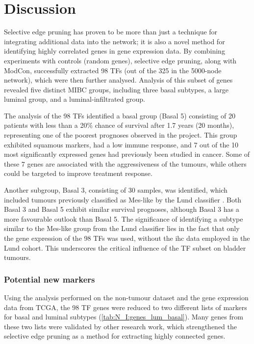 \section{Discussion}

Selective edge pruning has proven to be more than just a technique for integrating additional data into the network; it is also a novel method for identifying highly correlated genes in gene expression data. By combining experiments with controls (random genes), selective edge pruning, along with ModCon, successfully extracted 98 TFs (out of the 325 in the 5000-node network), which were then further analysed. Analysis of this subset of genes revealed five distinct MIBC groups, including three basal subtypes, a large luminal group, and a luminal-infiltrated group.

The analysis of the 98 TFs identified a basal group (Basal 5) consisting of 20 patients with less than a 20\% chance of survival after 1.7 years (20 months), representing one of the poorest prognoses observed in the project. This group exhibited squamous markers, had a low immune response, and 7 out of the 10 most significantly expressed genes had previously been studied in cancer. Some of these 7 genes are associated with the aggressiveness of the tumours, while others could be targeted to improve treatment response.

Another subgroup, Basal 3, consisting of 30 samples, was identified, which included tumours previously classified as Mes-like by the Lund classifier \citep{Marzouka2018-ge}. Both Basal 3 and Basal 5 exhibit similar survival prognoses, although Basal 3 has a more favourable outlook than Basal 5. The significance of identifying a subtype similar to the Mes-like group from the Lund classifier lies in the fact that only the gene expression of the 98 TFs was used, without the \acrlong{ihc} data employed in the Lund cohort. This underscores the critical influence of the TF subset on bladder tumours.



\subsubsection*{Potential new markers}

Using the analysis performed on the non-tumour dataset and the gene expression data from TCGA, the 98 TF genes were reduced to two different lists of markers for basal and luminal subtypes (\cref{tab:N_I:genes_lum_basal}). Many genes from these two lists were validated by other research work, which strengthened the selective edge pruning as a method for extracting highly connected genes.

